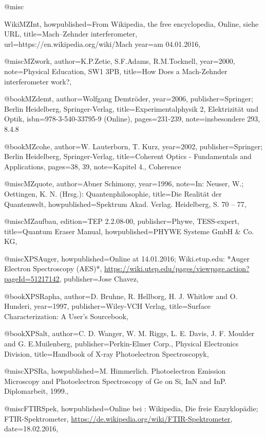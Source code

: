 @misc{WikiMZInt,
		howpublished={From Wikipedia, the free encyclopedia, Online, siehe URL},
	title={Mach–Zehnder interferometer},
	url={https://en.wikipedia.org/wiki/Mach%
	year={am 04.01.2016},
}

@misc{MZwork,
	author={K.P.Zetie, S.F.Adams, R.M.Tocknell},
	year={2000},
	note={Physical Education, SW1 3PB},
	title={How Does a Mach-Zehnder interferometer work?},
}

@book{MZdemt,
	author={Wolfgang Demtröder},
	year={2006},
	publisher={Springer; Berlin Heidelberg, Springer-Verlag},
	title={Experimentalphysik 2, Elektrizität und Optik},
	isbn={978-3-540-33795-9 (Online)},
	pages={231-239},
	note={insbesondere 293, 8.4.8}
}

@book{MZcohe,
	author={W. Lauterborn, T. Kurz},
	year={2002},
	publisher={Springer; Berlin Heidelberg, Springer-Verlag},
	title={Coherent Optics - Fundamentals and Applications},
	pages={38, 39},
	note={Kapitel 4., Coherence}
}

@misc{MZquote,
	author={Abner Schimony},
	year={1996},
	note={In: Neuser, W.; Oettingen, K. N. (Hrsg.): Quantenphilosophie},
	title={Die Realität der Quantenwelt},
	howpublished={Spektrum Akad. Verlag. Heidelberg, S. 70 – 77},
}

@misc{MZaufbau,
	edition={TEP 2.2.08-00},
	publisher={Phywe, TESS-expert},
	title={Quantum Eraser Manual},
	howpublished={PHYWE Systeme GmbH \& Co. KG},
}

@misc{XPSAuger,
	howpublished={Online at 14.01.2016; Wiki.etup.edu: *Auger Electron Spectroscopy (AES)*, \url{https://wiki.utep.edu/pages/viewpage.action?pageId=51217142}},
	publisher={Jose Chavez},
}

@book{XPSRapha,
	author={D. Bruhne, R. Hellborg, H. J. Whitlow and O. Hunderi},
	year={1997},
	publisher={Wiley-VCH Verlag},
	title={Surface Characterization: A User’s Sourcebook},
}

@book{XPSalt,
	author={C. D. Wanger, W. M. Riggs, L. E. Davis, J. F. Moulder and G. E.Muilenberg},
	publisher={Perkin-Elmer Corp., Physical Electronics Division},
	title={Handbook of X-ray Photoelectron Spectroscopyk},
}

@misc{XPSRa,
	howpublished={M. Himmerlich. Photoelectron Emission Microscopy and Photoelectron Spectroscopy of Ge on Si, InN and InP. Diplomarbeit, 1999.},
}

@misc{FTIRSpek,
	howpublished={Online bei : Wikipedia, Die freie Enzyklop\"adie; FTIR-Spektrometer, \url{https://de.wikipedia.org/wiki/FTIR-Spektrometer}},
	date={18.02.2016},
}

}
